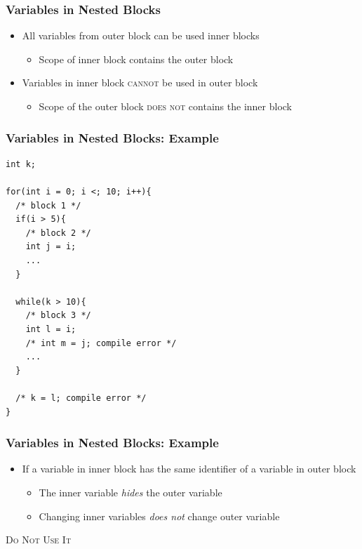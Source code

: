 \documentclass{../c-lecture}
\begin{document}
\begin{frame}
  \frametitle{Variables in Nested Blocks}
  \begin{itemize}
    \item All variables from outer block can be used inner blocks
    \begin{itemize}
      \item Scope of inner block contains the outer block
    \end{itemize}
    \item
      Variables in inner block \textsc{\color{RubineRed} cannot} be used in
      outer block
    \begin{itemize}
      \item
        Scope of the outer block
        \textsc{\color{RubineRed} does not} contains the inner block
    \end{itemize}
  \end{itemize}
\end{frame}

\begin{frame}[fragile]
  \frametitle{Variables in Nested Blocks: Example}
  \scriptsize
  \begin{verbatim}
int k;

for(int i = 0; i <; 10; i++){
  /* block 1 */
  if(i > 5){
    /* block 2 */
    int j = i;
    ...
  }

  while(k > 10){
    /* block 3 */
    int l = i;
    /* int m = j; compile error */
    ...
  }

  /* k = l; compile error */
}
  \end{verbatim}
\end{frame}

\begin{frame}
  \frametitle{Variables in Nested Blocks: Example}
  \begin{itemize}
    \item
      If a variable in inner block has the same identifier of a variable in
      outer block
    \begin{itemize}
      \item
        The inner variable \textit{\color{YellowOrange} hides} the outer
        variable
      \item
        Changing inner variables
        \textit{\color{LimeGreen} does not} change outer variable
    \end{itemize}
  \end{itemize}
  \textsc{\color{RubineRed} Do Not Use It}
\end{frame}
\end{document}
